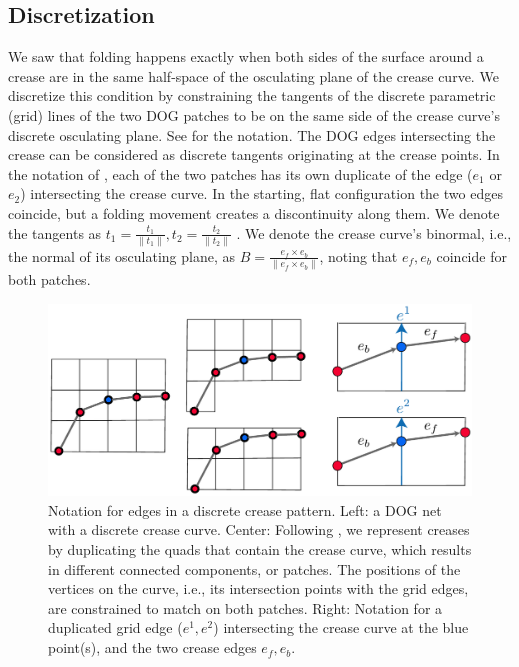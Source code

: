 \subsection{Discretization}
We saw that folding happens exactly when both sides of the surface around a crease are in the same half-space of the osculating plane of the crease curve. We discretize this condition by constraining the tangents of the discrete parametric (grid) lines of the two DOG patches to be on the same side of the crease curve's discrete osculating plane. See  for the notation. The DOG edges intersecting the crease can be considered as discrete tangents originating at the crease points. In the notation of , each of the two patches has its own duplicate of the edge ($e_1$ or $e_2$) intersecting the crease curve. In the starting, flat configuration the two edges coincide, but a folding movement creates a discontinuity along them. We denote the tangents as $t_1 = \frac{t_1}{\|t_1\|}, t_2 = \frac{t_2}{\|t_2\|}$ . We denote the crease curve's binormal, i.e., the normal of its osculating plane, as $B = \frac{e_f \times e_b}{\|e_f \times e_b\|}$, noting that $e_f,e_b$ coincide for both patches.

\begin{figure} [h]
	\centering
	\includegraphics[width=\linewidth]{figures/osc_plane_discretization}
	\caption{Notation for edges in a discrete crease pattern. Left: a DOG net with a discrete crease curve. Center: Following \cite{rabi2018shape}, we represent creases by duplicating the quads that contain the crease curve, which results in different connected components, or patches. The positions of the vertices on the curve, i.e., its intersection points with the grid edges, are constrained to match on both patches. Right: Notation for a duplicated grid edge ($e^1, e^2$) intersecting the crease curve at the blue point(s), and the two crease edges $e_f,e_b$. }
	\label{fig:osc_plane_discretization}
\end{figure}

